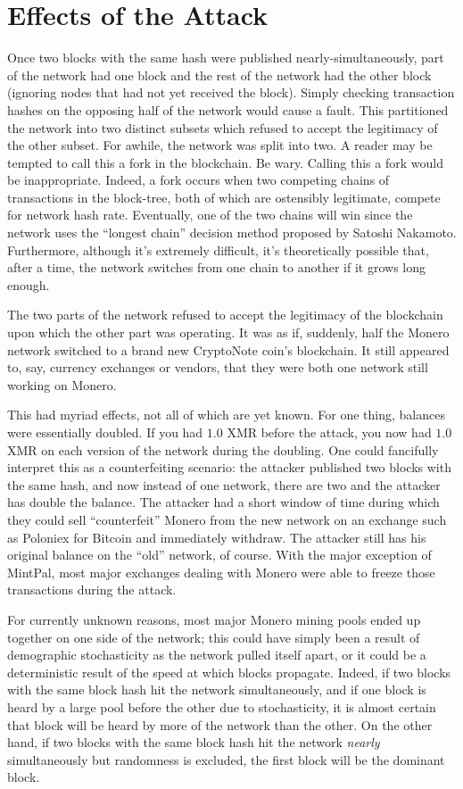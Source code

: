 \documentclass{mrl}
\begin{document}
\section{Effects of the Attack}

Once two blocks with the same hash were published nearly-simultaneously, part of the network had one block and the rest of the network had the other block (ignoring nodes that had not yet received the block). Simply checking transaction hashes on the opposing half of the network would cause a fault. This partitioned the network into two distinct subsets which refused to accept the legitimacy of the other subset. For awhile, the network was split into two. A reader may be tempted to call this a fork in the blockchain. Be wary. Calling this a fork would be inappropriate. Indeed, a fork occurs when two competing chains of transactions in the block-tree, both of which are ostensibly legitimate, compete for network hash rate. Eventually, one of the two chains will win since the network uses the ``longest chain'' decision method proposed by Satoshi Nakamoto. Furthermore, although it's extremely difficult, it's theoretically possible that, after a time, the network switches from one chain to another if it grows long enough.

The two parts of the network refused to accept the legitimacy of the blockchain upon which the other part was operating. It was as if, suddenly, half the Monero network switched to a brand new CryptoNote coin's blockchain. It still appeared to, say, currency exchanges or vendors, that they were both one network still working on Monero.

This had myriad effects, not all of which are yet known. For one thing, balances were essentially doubled. If you had $1.0$ XMR before the attack, you now had $1.0$ XMR on each version of the network during the doubling. One could fancifully interpret this as a counterfeiting scenario: the attacker published two blocks with the same hash, and now instead of one network, there are two and the attacker has double the balance. The attacker had a short window of time during which they could sell ``counterfeit'' Monero from the new network on an exchange such as Poloniex for Bitcoin and immediately withdraw. The attacker still has his original balance on the ``old'' network, of course. With the major exception of MintPal, most major exchanges dealing with Monero were able to freeze those transactions during the attack.

For currently unknown reasons, most major Monero mining pools ended up together on one side of the network; this could have simply been a result of demographic stochasticity as the network pulled itself apart, or it could be a deterministic result of the speed at which blocks propagate. Indeed, if two blocks with the same block hash hit the network simultaneously, and if one block is heard by a large pool before the other due to stochasticity, it is almost certain that block will be heard by more of the network than the other.  On the other hand, if two blocks with the same block hash hit the network \emph{nearly} simultaneously but randomness is excluded, the first block will be the dominant block. 
\end{document}
